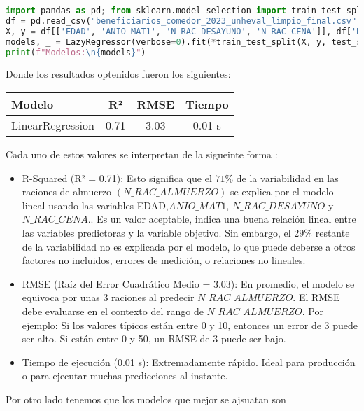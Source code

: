 \documentclass{article}
\begin{document}
\begin{lstlisting}[language=Python, caption={Uso de la libreria Lazypredict}]
import pandas as pd; from sklearn.model_selection import train_test_split; from lazypredict.Supervised import LazyRegressor
df = pd.read_csv("beneficiarios_comedor_2023_unheval_limpio_final.csv")[lambda x: x['N_RAC_ALMUERZO'] > 0]
X, y = df[['EDAD', 'ANIO_MAT1', 'N_RAC_DESAYUNO', 'N_RAC_CENA']], df['N_RAC_ALMUERZO']
models, _ = LazyRegressor(verbose=0).fit(*train_test_split(X, y, test_size=0.2, random_state=42))
print(f"Modelos:\n{models}")
\end{lstlisting}


Donde los resultados optenidos fueron los siguientes:

\begin{tcolorbox}[colback=gray!5, colframe=black, title=Resultados de Modelos]
\begin{tabular}{lccc}
\toprule
\textbf{Modelo} & \textbf{R²} & \textbf{RMSE} & \textbf{Tiempo} \\
\midrule
LinearRegression     & 0.71 & 3.03 & 0.01 s \\

\bottomrule
\end{tabular}
\end{tcolorbox}

Cada uno de estos valores se interpretan de la sigueinte forma :
\begin{itemize}
    \item R-Squared (R² = 0.71):
    Esto significa que el $ 71\%$ de la variabilidad en las raciones de almuerzo $(N\_RAC\_ALMUERZO)$ se explica por el modelo lineal usando las variables EDAD,$ ANIO\_MAT1$, $N\_RAC\_DESAYUNO$ y $N\_RAC\_CENA.$. Es un valor aceptable, indica una buena relación lineal entre las variables predictoras y la variable objetivo. Sin embargo, el $29\%$ restante de la variabilidad no es explicada por el modelo, lo que puede deberse a otros factores no incluidos, errores de medición, o relaciones no lineales.

    \item RMSE (Raíz del Error Cuadrático Medio = 3.03): En promedio, el modelo se equivoca por unas 3 raciones al predecir $N\_RAC\_ALMUERZO$. El RMSE debe evaluarse en el contexto del rango de $N\_RAC\_ALMUERZO$. Por ejemplo: Si los valores típicos están entre 0 y 10, entonces un error de 3 puede ser alto. Si están entre 0 y 50, un RMSE de 3 puede ser bajo.
    \item Tiempo de ejecución (0.01 s): Extremadamente rápido. Ideal para producción o para ejecutar muchas predicciones al instante.
  
\end{itemize}
Por otro lado tenemos que los modelos que mejor se ajsuatan son 
\end{document}

